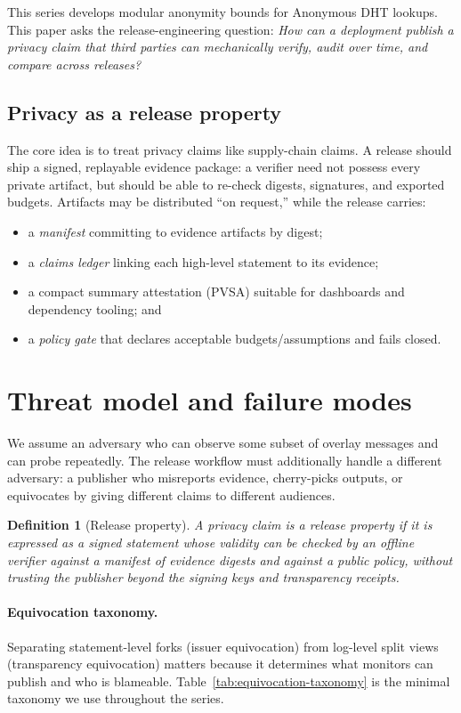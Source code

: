 \documentclass[11pt]{article}
\newtheorem{definition}{Definition}
\begin{document}
This series develops modular anonymity bounds for Anonymous DHT lookups.
This paper asks the release-engineering question:
\emph{How can a deployment publish a privacy claim that third parties can mechanically verify, audit over time, and compare across releases?}

\subsection{Privacy as a release property}
The core idea is to treat privacy claims like supply-chain claims.
A release should ship a signed, replayable evidence package: a verifier need not possess every private artifact, but should be able to re-check digests, signatures, and exported budgets.
Artifacts may be distributed ``on request,'' while the release carries:
\begin{itemize}[leftmargin=1.2em]
\item a \emph{manifest} committing to evidence artifacts by digest;
\item a \emph{claims ledger} linking each high-level statement to its evidence;
\item a compact summary attestation (PVSA) suitable for dashboards and dependency tooling; and
\item a \emph{policy gate} that declares acceptable budgets/assumptions and fails closed.
\end{itemize}

\section{Threat model and failure modes}
We assume an adversary who can observe some subset of overlay messages and can probe repeatedly.
The release workflow must additionally handle a different adversary: a publisher who misreports evidence, cherry-picks outputs, or equivocates by giving different claims to different audiences.

\begin{definition}[Release property]
A privacy claim is a \emph{release property} if it is expressed as a signed statement whose validity can be checked by an offline verifier against a manifest of evidence digests and against a public policy, without trusting the publisher beyond the signing keys and transparency receipts.
\end{definition}

\paragraph{Equivocation taxonomy.}
Separating statement-level forks (issuer equivocation) from log-level split views (transparency equivocation) matters because it determines what monitors can publish and who is blameable.
Table~\ref{tab:equivocation-taxonomy} is the minimal taxonomy we use throughout the series.
\end{document}

